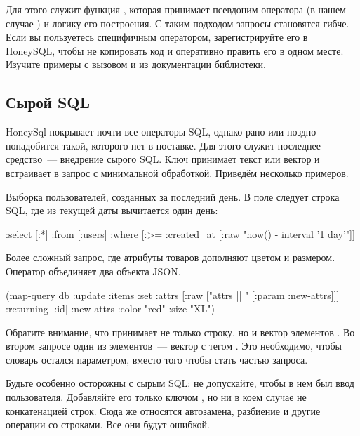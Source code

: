 Для этого служит функция , которая принимает псевдоним оператора (в нашем случае ) и логику его построения. С таким подходом запросы становятся гибче. Если вы пользуетесь специфичным оператором, зарегистрируйте его в HoneySQL, чтобы не копировать код и оперативно править его в одном месте. Изучите примеры с вызовом  и  из документации библиотеки.

\subsection{Сырой SQL}


HoneySql покрывает почти все операторы SQL, однако рано или поздно понадобится такой, которого нет в поставке. Для этого служит последнее средство~--- внедрение сырого SQL. Ключ  принимает текст или вектор и встраивает в запрос с минимальной обработкой. Приведём несколько примеров.

Выборка пользователей, созданных за последний день. В поле  следует строка SQL, где из текущей даты вычитается один день:

\begin{english}
  \begin{clojure/lines}
{:select [:*]
 :from [:users]
 :where [:>= :created_at
             [:raw "now() - interval '1 day'"]]}
  \end{clojure/lines}
\end{english}

Более сложный запрос, где атрибуты товаров дополняют цветом и размером. Оператор \code{||} объединяет два объекта JSON.

\begin{english}
  \begin{clojure}
(map-query
 db
 {:update :items
  :set {:attrs [:raw ["attrs || " [:param :new-attrs]]]}
  :returning [:id]}
 {:new-attrs {:color "red" :size "XL"}})
  \end{clojure}
\end{english}

Обратите внимание, что  принимает не только строку, но и вектор элементов . Во втором запросе один из элементов~--- вектор с тегом . Это необходимо, чтобы словарь  остался параметром, вместо того чтобы стать частью запроса.

Будьте особенно осторожны с сырым SQL: не допускайте, чтобы в нем был ввод пользователя. Добавляйте его только ключом , но ни в коем случае не конкатенацией строк. Сюда же относятся автозамена, разбиение и другие операции со строками. Все они будут ошибкой.

